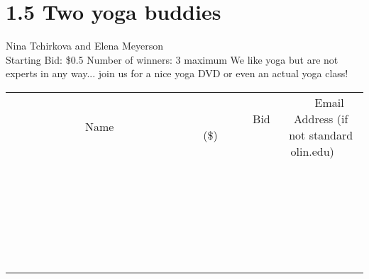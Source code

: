 \documentclass[11pt]{article}
\begin{document}
\section*{1.5 Two yoga buddies}
Nina Tchirkova and Elena Meyerson
\\
Starting Bid: \$0.5
\newline
Number of winners: 3 maximum 
\newline
We like yoga but are not experts in any way... join us for a nice yoga DVD or even an actual yoga class!
\\[6ex]
\begin{tabular}{c c c}
~~~~~~~~~~~~~Name~~~~~~~~~~~~~ & ~~~~~~~~~Bid (\$)~~~~~~~~~  & ~~~Email Address (if not standard olin.edu)~~~\\
 & & \\
\hline
 & & \\
\hline
 & & \\
\hline
 & & \\
\hline
 & & \\
\hline
 & & \\
\hline
 & & \\
\hline
 & & \\
\hline
 & & \\
\hline
 & & \\
\hline
 & & \\
\hline
 & & \\
\hline
 & & \\
\hline
 & & \\
\hline
 & & \\
\hline
 & & \\
\hline
 & & \\
\hline
 & & \\
\hline
 & & \\
\hline
 & & \\
\hline
 & & \\
\hline
 & & \\
\hline
 & & \\
\hline
 & & \\
\hline
 & & \\
\hline
 & & \\
\hline
\end{tabular}
\newpage
\end{document}
